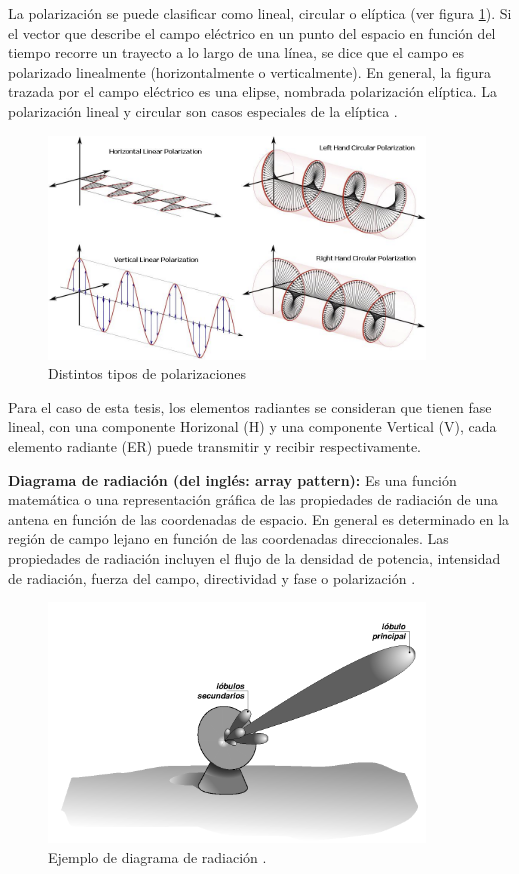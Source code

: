 La polarización se puede clasificar como lineal, circular o elíptica (ver figura \ref{fig:hvPolarizations}). Si el vector que 
describe el campo eléctrico en un punto del espacio en función del tiempo recorre un trayecto a lo largo de una línea, se dice
que el campo es polarizado linealmente (horizontalmente o verticalmente). En general, la figura trazada por el campo eléctrico 
es una elipse, nombrada polarización elíptica. La polarización lineal y circular son casos especiales de la elíptica \cite{Vita2012}.

\begin{figure}[H]
 \centering
 \includegraphics[width=10cm]{gfx/polarizations.png}
 \caption{Distintos tipos de polarizaciones \cite{Vita2012}}
 \label{fig:hvPolarizations}
\end{figure}

Para el caso de esta tesis, los elementos radiantes se consideran que tienen fase lineal, con una componente Horizonal (H) y una
componente Vertical (V), cada elemento radiante (ER) puede transmitir y recibir respectivamente.

{\textbf{Diagrama de radiación (del inglés: array pattern):}} Es una función matemática o una representación gráfica de las propiedades de radiación de
una antena en función de las coordenadas de espacio. En general es determinado en la región de campo lejano en función de las
coordenadas direccionales. Las propiedades de radiación incluyen el flujo de la densidad de potencia, intensidad de radiación,
fuerza del campo, directividad y fase o polarización \cite{Balanis2012}.


\begin{figure}[H]
 \centering
 \includegraphics[width=10cm]{gfx/arrayPattern.png}
 \caption{Ejemplo de diagrama de radiación \cite{Balanis2012}.}
\end{figure}

